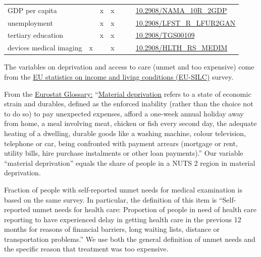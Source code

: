 \documentclass[a4paper,12pt]{article}
\begin{document}
\begin{table}[htbp]
\begin{tabular}{lllllll}
GDP per capita &  & x & x &  &  & \href{https://ec.europa.eu/eurostat/databrowser/view/nama\_10r\_2gdp/default/table?lang=en}{10.2908/NAMA\_10R\_2GDP}\\
unemployment &  & x & x &  &  & \href{https://ec.europa.eu/eurostat/databrowser/view/lfst\_r\_lfur2gan/default/table}{10.2908/LFST\_R\_LFUR2GAN}\\
tertiary education &  & x & x &  &  & \href{https://ec.europa.eu/eurostat/databrowser/view/tgs00109/default/table?lang=en\&category=t\_reg.t\_reg\_educ}{10.2908/TGS00109}\\
devices medical imaging & x &  & x &  &  & \href{https://ec.europa.eu/eurostat/databrowser/view/hlth\_rs\_medim/default/table?lang=en}{10.2908/HLTH\_RS\_MEDIM}\\
\end{tabular}
\end{table}



The variables on deprivation and access to care (unmet and too expensive) come from the \href{https://ec.europa.eu/eurostat/statistics-explained/index.php?title=EU\_statistics\_on\_income\_and\_living\_conditions\_(EU-SILC)\_methodology}{EU statistics on income and living conditions (EU-SILC)} survey.

From the \href{https://ec.europa.eu/eurostat/statistics-explained/index.php?title=Glossary:At-risk-of-poverty\_rate}{Eurostat Glossary:} ``\href{https://ec.europa.eu/eurostat/statistics-explained/index.php?title=Glossary:Material\_deprivation}{Material deprivation} refers to a state of economic strain and durables, defined as the enforced inability (rather than the choice not to do so) to pay unexpected expenses, afford a one-week annual holiday away from home, a meal involving meat, chicken or fish every second day, the adequate heating of a dwelling, durable goods like a washing machine, colour television, telephone or car, being confronted with payment arrears (mortgage or rent, utility bills, hire purchase instalments or other loan payments).'' Our variable ``material deprivation'' equals the share of people in a NUTS 2 region in material deprivation.

Fraction of people with self-reported unmet needs for medical examination is based on the same survey. In particular, the definition of this item is ``Self-reported unmet needs for health care: Proportion of people in need of health care reporting to have experienced delay in getting health care in the previous 12 months for reasons of financial barriers, long waiting lists, distance or transportation problems.'' We use both the general definition of unmet needs and the specific reason that treatment was too expensive.
\end{document}
